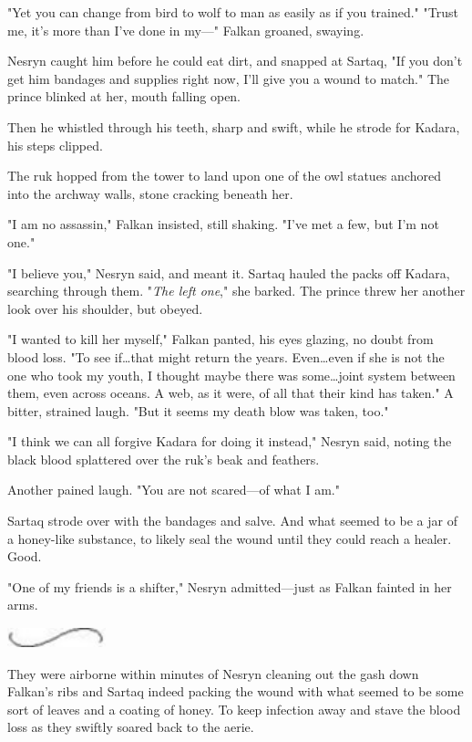 "Yet you can change from bird to wolf to man as easily as if you trained."
"Trust me, it's more than I've done in my---" Falkan groaned, swaying.

Nesryn caught him before he could eat dirt, and snapped at Sartaq, "If you don't get him bandages and supplies right now, I'll give you a wound to match."
The prince blinked at her, mouth falling open.

Then he whistled through his teeth, sharp and swift, while he strode for Kadara, his steps clipped.

The ruk hopped from the tower to land upon one of the owl statues anchored into the archway walls, stone cracking beneath her.

"I am no assassin," Falkan insisted, still shaking.
"I've met a few, but I'm not one."

"I believe you," Nesryn said, and meant it.
Sartaq hauled the packs off Kadara, searching through them.
"\emph{The left one}," she barked.
The prince threw her another look over his shoulder, but obeyed.

"I wanted to kill her myself," Falkan panted, his eyes glazing, no doubt from blood loss.
"To see if\ldots that might return the years.
Even\ldots even if she is not the one who took my youth, I thought maybe there was some\ldots joint system between them, even across oceans.
A web, as it were, of all that their kind has taken."
A bitter, strained laugh.
"But it seems my death blow was taken, too."

"I think we can all forgive Kadara for doing it instead," Nesryn said, noting the black blood splattered over the ruk's beak and feathers.

Another pained laugh.
"You are not scared---of what I am."

Sartaq strode over with the bandages and salve.
And what seemed to be a jar of a honey-like substance, to likely seal the wound until they could reach a healer.
Good.

"One of my friends is a shifter," Nesryn admitted---just as Falkan fainted in her arms.

\begin{center}
	\includegraphics[width=1.12in,height=0.24in]{images/seperator}
\end{center}

They were airborne within minutes of Nesryn cleaning out the gash down Falkan's ribs and Sartaq indeed packing the wound with what seemed to be some sort of leaves and a coating of honey.
To keep infection away and stave the blood loss as they swiftly soared back to the aerie.

